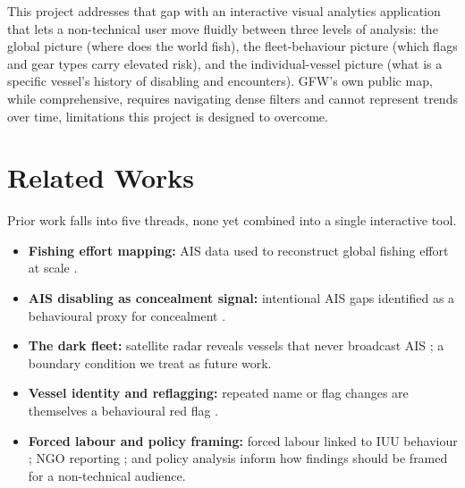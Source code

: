 \documentclass[sigconf]{acmart}
\begin{document}
This project addresses that gap with an interactive visual analytics application that lets a non-technical user move fluidly between three levels of analysis: the global picture (where does the world fish), the fleet-behaviour picture (which flags and gear types carry elevated risk), and the individual-vessel picture (what is a specific vessel's history of disabling and encounters). GFW's own public map, while comprehensive, requires navigating dense filters and cannot represent trends over time, limitations this project is designed to overcome.

\section{Related Works}
Prior work falls into five threads, none yet combined into a single interactive tool.
\begin{itemize}
    \item \textbf{Fishing effort mapping:} AIS data used to reconstruct global fishing effort at scale \cite{Kroodsma2018}.
    \item \textbf{AIS disabling as concealment signal:} intentional AIS gaps identified as a behavioural proxy for concealment \cite{Welch2022}.
    \item \textbf{The dark fleet:} satellite radar reveals vessels that never broadcast AIS \cite{Paolo2024}; a boundary condition we treat as future work.
    \item \textbf{Vessel identity and reflagging:} repeated name or flag changes are themselves a behavioural red flag \cite{Park2023}.
    \item \textbf{Forced labour and policy framing:} forced labour linked to IUU behaviour \cite{Selig2022}; NGO reporting \cite{EJF}; \cite{Oceana} and policy analysis \cite{LimJung2025} inform how findings should be framed for a non-technical audience.
\end{itemize}
\end{document}
